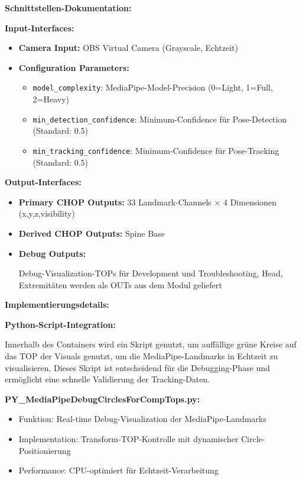 \textbf{Schnittstellen-Dokumentation:}

\textbf{Input-Interfaces:}
\begin{itemize}
    \item \textbf{Camera Input:} OBS Virtual Camera (Grayscale, Echtzeit)
    \item \textbf{Configuration Parameters:} 
    \begin{itemize}
        \item \texttt{model\_complexity}: MediaPipe-Model-Precision (0=Light, 1=Full, 2=Heavy)
        \item \texttt{min\_detection\_confidence}: Minimum-Confidence für Pose-Detection (Standard: 0.5)
        \item \texttt{min\_tracking\_confidence}: Minimum-Confidence für Pose-Tracking (Standard: 0.5)
    \end{itemize}
\end{itemize}

\textbf{Output-Interfaces:}
\begin{itemize}
    \item \textbf{Primary CHOP Outputs:} 33 Landmark-Channels × 4 Dimensionen (x,y,z,visibility)
    \item \textbf{Derived CHOP Outputs:} Spine Base
    \item \textbf{Debug Outputs:} \raggedright Debug-Visualization-TOPs für Development und Troubleshooting, Head, Extremitäten werden als OUTs aus dem Modul geliefert
\end{itemize}

\textbf{Implementierungsdetails:}

\textbf{Python-Script-Integration:}

\raggedright Innerhalb des Containers wird ein Skript genutzt, um auffällige grüne Kreise auf das TOP der Visuals genutzt, um die MediaPipe-Landmarks in Echtzeit zu visualisieren. Dieses Skript ist entscheidend für die Debugging-Phase und ermöglicht eine schnelle Validierung der Tracking-Daten.

\textbf{PY\_MediaPipeDebugCirclesForCompTops.py:}
\begin{itemize}
    \item Funktion: Real-time Debug-Visualization der MediaPipe-Landmarks
    \item Implementation: Transform-TOP-Kontrolle mit dynamischer Circle-Positionierung
    \item Performance: CPU-optimiert für Echtzeit-Verarbeitung
\end{itemize}

